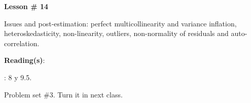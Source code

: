\documentclass[letterpaper]{article}
\renewenvironment{itemize}{
  \begin{list}{}{
    \setlength{\leftmargin}{1.5em}
  }
}{
  \end{list}
}
\begin{document}
\begin{enumerate}
\begin{itemize}
\begin{itemize}
\begin{itemize}
							\end{itemize}
					\end{itemize}
			\end{itemize}



			\begin{itemize} 
				\item[$\bullet$] {\bf Lesson \# 14} %
					\begin{itemize} 
						\item[$\circ$] Issues and post-estimation: perfect multicollinearity and variance inflation, heteroskedasticity, non-linearity, outliers, non-normality of residuals and auto-correlation. %
						\item[$\circ$] {\bf Reading(s)}: 
						\begin{itemize}
						\item[$\diamond$] \textcite{Wooldridge2002}: 8 y 9.5.
						\end{itemize}
					\end{itemize}
			\end{itemize}




\item[{\color{red}\Pointinghand}] Problem set \#3. Turn it in next class.



\end{enumerate}
\end{document}
